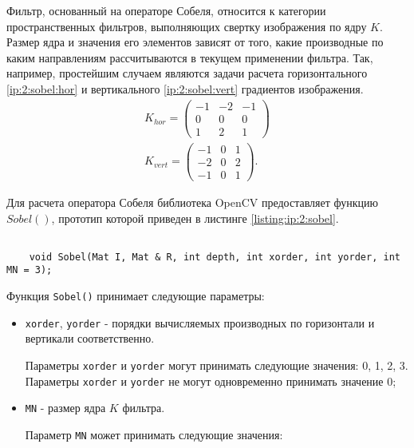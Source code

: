 \begin{itemize}
	Фильтр, основанный на операторе Собеля, относится к категории пространственных фильтров, выполняющих свертку изображения по ядру $K$. Размер ядра и значения его элементов зависят от того, какие производные по каким направлениям рассчитываются в текущем применении фильтра. Так, например, простейшим случаем являются задачи расчета горизонтального \eqref{ip:2:sobel:hor} и вертикального \eqref{ip:2:sobel:vert} градиентов изображения.
	\begin{gather}
		\label{ip:2:sobel:hor}
		K_{hor} = \left(
		\begin{array}{ccc}
			-1 & -2 & -1 \\
			0 & 0 & 0 \\
			1 & 2 & 1
		\end{array}
		\right) \\
		\label{ip:2:sobel:vert}
		K_{vert} = \left(
		\begin{array}{ccc}
			-1 & 0 & 1 \\
			-2 & 0 & 2 \\
			-1 & 0 & 1
		\end{array}
		\right).
	\end{gather}
	
	Для расчета оператора Собеля библиотека OpenCV предоставляет функцию $Sobel()$, прототип которой приведен в листинге \ref{listing:ip:2:sobel}.
	
	\begin{lstlisting}

	void Sobel(Mat I, Mat & R, int depth, int xorder, int yorder, int MN = 3);

	\end{lstlisting}
	\mylistingend

	Функция \verb|Sobel()| принимает следующие параметры:

	\begin{itemize}

		\item \verb|xorder|, \verb|yorder| - порядки вычисляемых производных по горизонтали и вертикали соответственно.

		Параметры \verb|xorder| и \verb|yorder| могут принимать следующие значения: 0, 1, 2, 3. Параметры \verb|xorder| и \verb|yorder| не могут одновременно принимать значение 0;

		\item \verb|MN| - размер ядра $K$ фильтра.

		Параметр \verb|MN| может принимать следующие значения:


\end{itemize}
\end{itemize}
